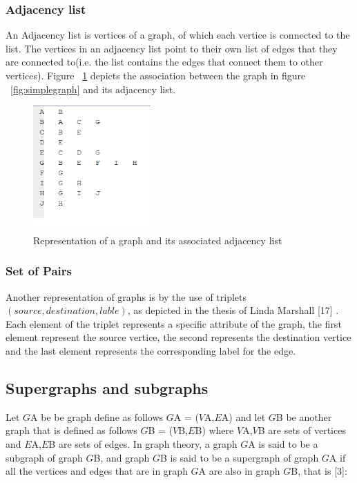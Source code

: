 \subsubsection{Adjacency list}
An Adjacency list is vertices of a graph, of which each vertice is connected to the list. The vertices in an adjacency list point to their own list of edges that they are connected to(i.e. the list contains the edges that connect them to other vertices). \newpage
Figure ~\ref{fig:adjacencylist} depicts the association between the graph in figure ~\ref{fig:simplegraph} and its adjacency list.
\begin{figure}[H]
  \begin{center}
      \includegraphics[width=0.4\textwidth]{list.png}
  \end{center}    
  \caption{Representation of a graph and its associated adjacency list}
  \label{fig:adjacencylist}
\end{figure}

\subsubsection{Set of Pairs}
Another representation of graphs is by the use of triplets $(source,destination,lable)$, as depicted in the thesis of Linda Marshall [17] . Each element of the triplet represents a specific attribute of the graph, the first element represent the source vertice, the second represents the destination vertice and the last element represents the corresponding label for the edge.  

\subsection{Supergraphs and subgraphs}
Let $G${\tiny A} be be graph define as follows $G${\tiny A} = ($V${\tiny A},$E${\tiny A}) and let $G${\tiny B} be another graph that is defined as follows $G${\tiny B} = ($V${\tiny B},$E${\tiny B}) where $V${\tiny A},$V${\tiny B} are sets of vertices and $E${\tiny A},$E${\tiny B} are sets of edges.
In graph theory, a graph $G${\tiny A} is said to be a subgraph of graph $G${\tiny B}, and graph $G${\tiny B} is said to be a supergraph of graph $G${\tiny A} if all the vertices and edges that are in graph $G${\tiny A} are also in graph $G${\tiny B}, that is [3]:


